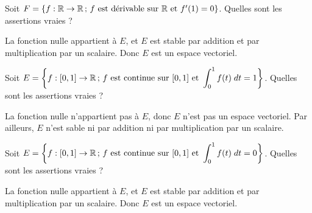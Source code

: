 \begin{question}
Soit $F=\{f:\mathbb{R} \to \mathbb{R} \, ; \, f\mbox{ est dérivable sur }\mathbb{R} \mbox{ et }f'(1)=0\}$. Quelles sont les assertions vraies ?
\begin{answers}  
\end{answers}
\begin{explanations} La fonction nulle appartient à $E$, et $E$ est stable par addition et par multiplication par un scalaire. Donc $E$ est un espace vectoriel.
\end{explanations}
\end{question}

\begin{question}
Soit $\displaystyle E =\left\{f :[0,1] \to \mathbb{R} \, ; \, f\mbox{ est continue sur } [0,1]\mbox{ et }\int_0^1 f(t) \; dt =1\right\}$. Quelles sont les assertions vraies ?
\begin{answers}  
\end{answers}
\begin{explanations} La fonction nulle n'appartient pas à $E$, donc $E$ n'est pas un espace vectoriel. Par ailleurs, $E$ n'est sable ni par addition ni par multiplication par un scalaire.
\end{explanations}
\end{question}


\begin{question}
Soit $\displaystyle E=\left\{f :[0,1]\to \mathbb{R} \, ; \, f\mbox{ est continue sur }[0,1]   \mbox{ et } \int_0^1 f(t)\; dt =0\right\}$. Quelles sont les assertions vraies ?
\begin{answers}  
\end{answers}
\begin{explanations} La fonction nulle appartient à $E$, et $E$ est stable par addition et par multiplication par un scalaire. Donc $E$ est un espace vectoriel.
\end{explanations}
\end{question}


